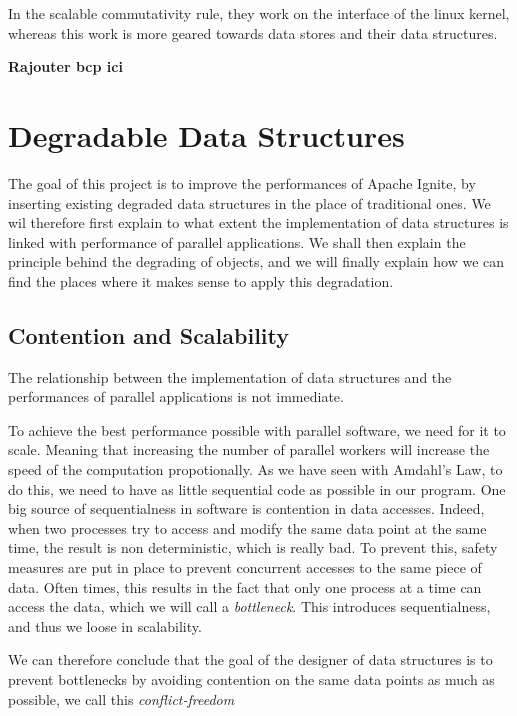 \documentclass[conference]{IEEEtran}
\begin{document}
In the scalable commutativity rule, they work on the interface of the linux kernel, whereas this work is more geared towards data stores and their data structures.

\textbf{Rajouter bcp ici}


\section{Degradable Data Structures}
The goal of this project is to improve the performances of Apache Ignite, by inserting existing degraded data structures in the place of traditional ones. We wil therefore first explain to what extent the implementation of data structures is linked with performance of parallel applications. We shall then explain the principle behind the degrading of objects, and we will finally explain how we can find the places where it makes sense to apply this degradation.

\subsection{Contention and Scalability} 
The relationship between the implementation of data structures and the performances of parallel applications is not immediate.

To achieve the best performance possible with parallel software, we need for it to scale. Meaning that increasing the number of parallel workers will increase the speed of the computation propotionally. As we have seen with Amdahl's Law, to do this, we need to have as little sequential code as possible in our program. One big source of sequentialness in software is contention in data accesses. Indeed, when two processes try to access and modify the same data point at the same time, the result is non deterministic, which is really bad. To prevent this, safety measures are put in place to prevent concurrent accesses to the same piece of data. Often times, this results in the fact that only one process at a time can access the data, which we will call a \textit{bottleneck}. This introduces sequentialness, and thus we loose in scalability.

We can therefore conclude that the goal of the designer of data structures is to prevent bottlenecks by avoiding contention on the same data points as much as possible, we call this \textit{conflict-freedom}
\end{document}
